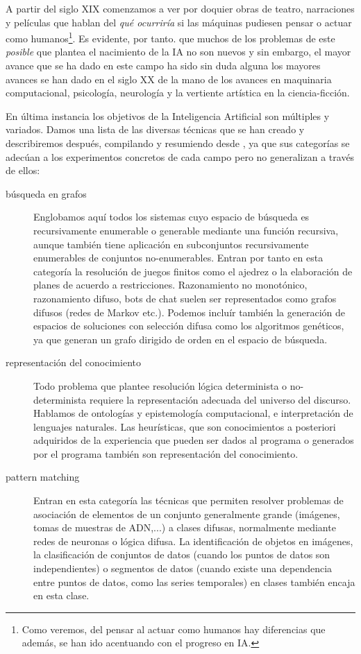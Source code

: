 \documentclass[12pt]{memoir}
\begin{document}
A partir del siglo XIX comenzamos a ver por doquier obras de teatro, narraciones y películas que hablan del \textit{qué ocurriría} si las máquinas pudiesen pensar o actuar como humanos\footnote{Como veremos, del pensar al actuar como humanos hay diferencias que además, se han ido acentuando con el progreso en IA.}. Es evidente, por tanto. que muchos de los problemas de este \textit{posible} que plantea el nacimiento de la IA no son nuevos y sin embargo, el mayor avance que se ha dado en este campo ha sido sin duda alguna los mayores avances se han dado en el siglo XX de la mano de los avances en maquinaria computacional, psicología, neurología y la vertiente artística en la ciencia-ficción.

En última instancia los objetivos de la Inteligencia Artificial son múltiples y variados. Damos una lista de las diversas técnicas que se han creado y describiremos después, compilando y resumiendo desde \cite{mcarthy2007}, ya que sus categorías se adecúan a los experimentos concretos de cada campo pero no generalizan a través de ellos:

\begin{description}
	\item[búsqueda en grafos] Englobamos aquí todos los sistemas cuyo espacio de búsqueda es recursivamente enumerable o generable mediante una función recursiva, aunque también tiene aplicación en subconjuntos recursivamente enumerables de conjuntos no-enumerables. Entran por tanto en esta categoría la resolución de juegos finitos como el ajedrez o la elaboración de planes de acuerdo a restricciones. Razonamiento no monotónico, razonamiento difuso, bots de chat suelen ser representados como grafos difusos (redes de Markov etc.). Podemos incluír también la generación de espacios de soluciones con selección difusa como los algoritmos genéticos, ya que generan un grafo dirigido de orden en el espacio de búsqueda.
\end{description}
\begin{description}
	\item[representación del conocimiento] Todo problema que plantee resolución lógica determinista o no-determinista requiere la representación adecuada del universo del discurso. Hablamos de ontologías y epistemología computacional, e interpretación de lenguajes naturales. Las heurísticas, que son conocimientos a posteriori adquiridos de la experiencia que pueden ser dados al programa o generados por el programa también son representación del conocimiento.
\end{description}
\begin{description}
	\item[pattern matching] Entran en esta categoría las técnicas que permiten resolver problemas de asociación de elementos de un conjunto generalmente grande (imágenes, tomas de muestras de ADN,...) a clases difusas, normalmente mediante redes de neuronas o lógica difusa. La identificación de objetos en imágenes, la clasificación de conjuntos de datos (cuando los puntos de datos son independientes) o segmentos de datos (cuando existe una dependencia entre puntos de datos, como las series temporales) en clases también encaja en esta clase.
\end{description}
\end{document}
